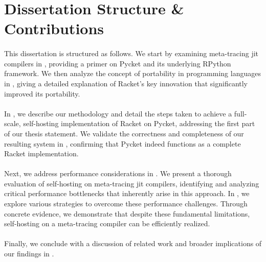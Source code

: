     \section[\texorpdfstring{Dissertation Structure \& Contributions}{Structure \& Contributions}]{Dissertation Structure \& Contributions}

        \paragraph{}%
            This dissertation is structured as follows. We start by examining meta-tracing \gls{jit} compilers in , providing a primer on Pycket and its underlying RPython framework. We then analyze the concept of portability in programming languages in , giving a detailed explanation of Racket's key innovation that significantly improved its portability.

        \paragraph{}%
            In , we describe our methodology and detail the steps taken to achieve a full-scale, self-hosting implementation of Racket on Pycket, addressing the first part of our thesis statement. We validate the correctness and completeness of our resulting system in , confirming that Pycket indeed functions as a complete Racket implementation.

        \paragraph{}%
            Next, we address performance considerations in . We present a thorough evaluation of self-hosting on meta-tracing \gls{jit} compilers, identifying and analyzing critical performance bottlenecks that inherently arise in this approach. In , we explore various strategies to overcome these performance challenges. Through concrete evidence, we demonstrate that despite these fundamental limitations, self-hosting on a meta-tracing compiler can be efficiently realized.

        \paragraph{}%
            Finally, we conclude with a discussion of related work and broader implications of our findings in .

